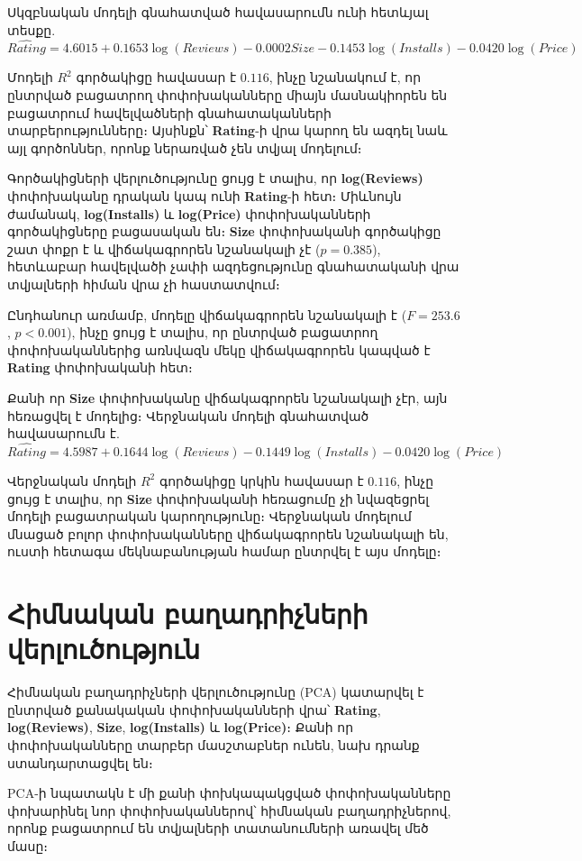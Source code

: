 \documentclass[11pt]{article}
\begin{document}
Սկզբնական մոդելի գնահատված հավասարումն ունի հետևյալ տեսքը.
\[
\widehat{\textit{Rating}}
=
4.6015
+
0.1653 \log(\textit{Reviews})
-
0.0002 \textit{Size}
-
0.1453 \log(\textit{Installs})
-
0.0420 \log(\textit{Price})
\]

Մոդելի \(R^2\) գործակիցը հավասար է \(0.116\), ինչը նշանակում է, որ ընտրված բացատրող փոփոխականները միայն մասնակիորեն են բացատրում հավելվածների գնահատականների տարբերությունները։ Այսինքն՝ \textbf{Rating}-ի վրա կարող են ազդել նաև այլ գործոններ, որոնք ներառված չեն տվյալ մոդելում։

Գործակիցների վերլուծությունը ցույց է տալիս, որ \textbf{log(Reviews)} փոփոխականը դրական կապ ունի \textbf{Rating}-ի հետ։ Միևնույն ժամանակ, \textbf{log(Installs)} և \textbf{log(Price)} փոփոխականների գործակիցները բացասական են։ \textbf{Size} փոփոխականի գործակիցը շատ փոքր է և վիճակագրորեն նշանակալի չէ (\(p=0.385\)), հետևաբար հավելվածի չափի ազդեցությունը գնահատականի վրա տվյալների հիման վրա չի հաստատվում։

Ընդհանուր առմամբ, մոդելը վիճակագրորեն նշանակալի է (\(F=253.6\), \(p<0.001\)), ինչը ցույց է տալիս, որ ընտրված բացատրող փոփոխականներից առնվազն մեկը վիճակագրորեն կապված է \textbf{Rating} փոփոխականի հետ։

Քանի որ \textbf{Size} փոփոխականը վիճակագրորեն նշանակալի չէր, այն հեռացվել է մոդելից։ Վերջնական մոդելի գնահատված հավասարումն է.
\[
\widehat{\textit{Rating}}
=
4.5987
+
0.1644 \log(\textit{Reviews})
-
0.1449 \log(\textit{Installs})
-
0.0420 \log(\textit{Price})
\]

Վերջնական մոդելի \(R^2\) գործակիցը կրկին հավասար է \(0.116\), ինչը ցույց է տալիս, որ \textbf{Size} փոփոխականի հեռացումը չի նվազեցրել մոդելի բացատրական կարողությունը։ Վերջնական մոդելում մնացած բոլոր փոփոխականները վիճակագրորեն նշանակալի են, ուստի հետագա մեկնաբանության համար ընտրվել է այս մոդելը։

\section{Հիմնական բաղադրիչների վերլուծություն}

Հիմնական բաղադրիչների վերլուծությունը (PCA) կատարվել է ընտրված քանակական փոփոխականների վրա՝ \textbf{Rating}, \textbf{log(Reviews)}, \textbf{Size}, \textbf{log(Installs)} և \textbf{log(Price)}։ Քանի որ փոփոխականները տարբեր մասշտաբներ ունեն, նախ դրանք ստանդարտացվել են։

PCA-ի նպատակն է մի քանի փոխկապակցված փոփոխականները փոխարինել նոր փոփոխականներով՝ հիմնական բաղադրիչներով, որոնք բացատրում են տվյալների տատանումների առավել մեծ մասը։
\end{document}
